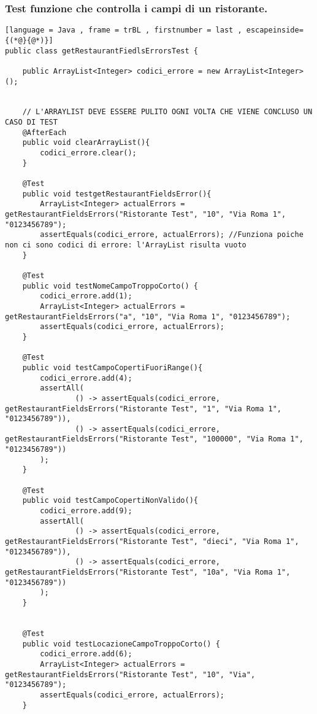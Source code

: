 \subsubsection{Test funzione che controlla i campi di un ristorante.}

\begin{lstlisting}[language = Java , frame = trBL , firstnumber = last , escapeinside={(*@}{@*)}]
public class getRestaurantFiedlsErrorsTest {

    public ArrayList<Integer> codici_errore = new ArrayList<Integer>();


    // L'ARRAYLIST DEVE ESSERE PULITO OGNI VOLTA CHE VIENE CONCLUSO UN CASO DI TEST
    @AfterEach
    public void clearArrayList(){
        codici_errore.clear();
    }

    @Test
    public void testgetRestaurantFieldsError(){
        ArrayList<Integer> actualErrors = getRestaurantFieldsErrors("Ristorante Test", "10", "Via Roma 1", "0123456789");
        assertEquals(codici_errore, actualErrors); //Funziona poiche non ci sono codici di errore: l'ArrayList risulta vuoto
    }

    @Test
    public void testNomeCampoTroppoCorto() {
        codici_errore.add(1);
        ArrayList<Integer> actualErrors = getRestaurantFieldsErrors("a", "10", "Via Roma 1", "0123456789");
        assertEquals(codici_errore, actualErrors);
    }

    @Test
    public void testCampoCopertiFuoriRange(){
        codici_errore.add(4);
        assertAll(
                () -> assertEquals(codici_errore, getRestaurantFieldsErrors("Ristorante Test", "1", "Via Roma 1", "0123456789")),
                () -> assertEquals(codici_errore, getRestaurantFieldsErrors("Ristorante Test", "100000", "Via Roma 1", "0123456789"))
        );
    }

    @Test
    public void testCampoCopertiNonValido(){
        codici_errore.add(9);
        assertAll(
                () -> assertEquals(codici_errore, getRestaurantFieldsErrors("Ristorante Test", "dieci", "Via Roma 1", "0123456789")),
                () -> assertEquals(codici_errore, getRestaurantFieldsErrors("Ristorante Test", "10a", "Via Roma 1", "0123456789"))
        );
    }


    @Test
    public void testLocazioneCampoTroppoCorto() {
        codici_errore.add(6);
        ArrayList<Integer> actualErrors = getRestaurantFieldsErrors("Ristorante Test", "10", "Via", "0123456789");
        assertEquals(codici_errore, actualErrors);
    }


\end{lstlisting}
